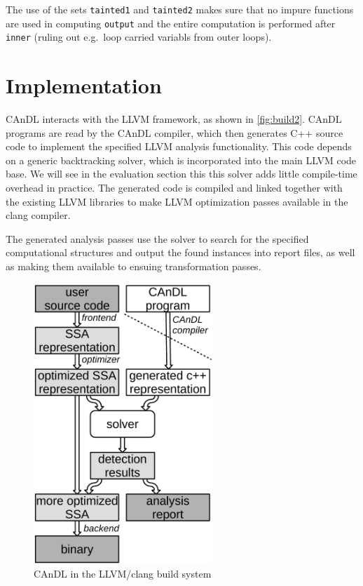     The use of the sets \texttt{tainted1} and \texttt{tainted2} makes sure that
    no impure functions are used in computing \texttt{output} and the entire
    computation is performed after \texttt{inner} (ruling out e.g.\ loop carried
    variabls from outer loops).

\section{Implementation}

    CAnDL interacts with the LLVM framework, as shown in \autoref{fig:build2}.
    CAnDL programs are read by the CAnDL compiler, which then generates C++
    source code to implement the specified LLVM analysis functionality.
    This code depends on a generic backtracking solver, which is incorporated
    into the main LLVM code base. 
    We will see in the evaluation section this this solver adds little
    compile-time overhead in practice.
    The generated code is compiled and linked together with the existing LLVM
    libraries to make LLVM optimization passes available in the clang compiler.

    The generated analysis passes use the solver to search for the specified
    computational structures and output the found instances into report files,
    as well as making them available to ensuing transformation passes.

\begin{figure}[ht]
\centering
\includegraphics[width=0.6\textwidth]{figures/compilerFlow2.pdf}
\caption{CAnDL in the LLVM/clang build system}
\label{fig:build2}
\end{figure}

